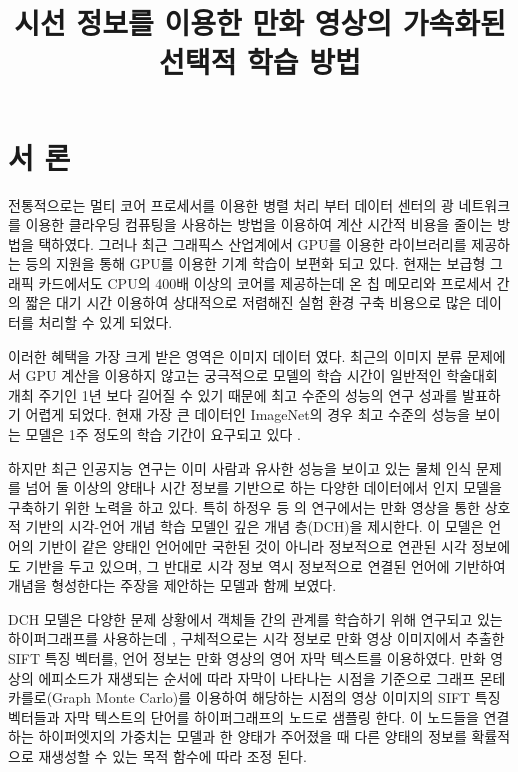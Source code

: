 \documentclass{kcc}
\title{시선 정보를 이용한 만화 영상의 가속화된 선택적 학습 방법}
\author{
}
\begin{document}
\maketitle


\section{서 론}
전통적으로는 멀티 코어 프로세서를 이용한 병렬 처리 부터 데이터 센터의 광 네트워크를 이용한 클라우딩 컴퓨팅을 사용하는 방법을 이용하여 계산 시간적 비용을 줄이는 방법을 택하였다. 그러나 최근 그래픽스 산업계에서 GPU를 이용한 라이브러리를 제공하는 등의 지원을 통해 GPU를 이용한 기계 학습이 보편화 되고 있다. 현재는 보급형 그래픽 카드에서도 CPU의 400배 이상의 코어를 제공하는데 온 칩 메모리와 프로세서 간의 짧은 대기 시간 이용하여 상대적으로 저렴해진 실험 환경 구축 비용으로 많은 데이터를 처리할 수 있게 되었다.

이러한 혜택을 가장 크게 받은 영역은 이미지 데이터 였다. 최근의 이미지 분류 문제에서 GPU 계산을 이용하지 않고는 궁극적으로 모델의 학습 시간이 일반적인 학술대회 개최 주기인 1년 보다 길어질 수 있기 때문에 최고 수준의 성능의 연구 성과를 발표하기 어렵게 되었다. 현재 가장 큰 데이터인 ImageNet의 경우 최고 수준의 성능을 보이는 모델은 1주 정도의 학습 기간이 요구되고 있다 \cite{krizhevsky2012imagenet}.

하지만 최근 인공지능 연구는 이미 사람과 유사한 성능을 보이고 있는 물체 인식 문제를 넘어 둘 이상의 양태나 시간 정보를 기반으로 하는 다양한 데이터에서 인지 모델을 구축하기 위한 노력을 하고 있다. 특히 하정우 등 \cite{zhou2006learning}\cite{Ha2015}의 연구에서는 만화 영상을 통한 상호적 기반의 시각-언어 개념 학습 모델인 깊은 개념 층(DCH)을 제시한다. 이 모델은 언어의 기반이 같은 양태인 언어에만 국한된 것이 아니라 정보적으로 연관된 시각 정보에도 기반을 두고 있으며, 그 반대로 시각 정보 역시 정보적으로 연결된 언어에 기반하여 개념을 형성한다는 주장을 제안하는 모델과 함께 보였다. 

DCH 모델은 다양한 문제 상황에서 객체들 간의 관계를 학습하기 위해 연구되고 있는 하이퍼그래프를 사용하는데 \cite{zhou2006learning}, 구체적으로는 시각 정보로 만화 영상 이미지에서 추출한 SIFT 특징 벡터를, 언어 정보는 만화 영상의 영어 자막 텍스트를 이용하였다. 만화 영상의 에피소드가 재생되는 순서에 따라 자막이 나타나는 시점을 기준으로 그래프 몬테 카를로(Graph Monte Carlo)를 이용하여 해당하는 시점의 영상 이미지의 SIFT 특징 벡터들과 자막 텍스트의 단어를 하이퍼그래프의 노드로 샘플링 한다. 이 노드들을 연결하는 하이퍼엣지의 가중치는 모델과 한 양태가 주어졌을 때 다른 양태의 정보를 확률적으로 재생성할 수 있는 목적 함수에 따라 조정 된다. 
\end{document}

